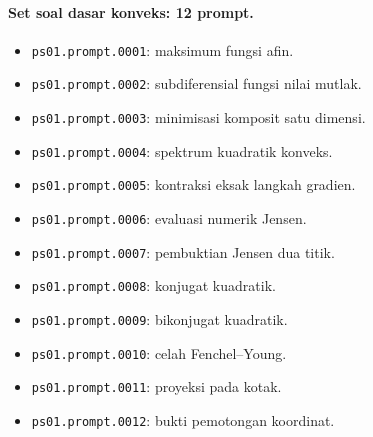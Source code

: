 \paragraph{Set soal dasar konveks: 12 prompt.}
\begin{itemize}
\item \texttt{ps01.prompt.0001}: maksimum fungsi afin.
\item \texttt{ps01.prompt.0002}: subdiferensial fungsi nilai mutlak.
\item \texttt{ps01.prompt.0003}: minimisasi komposit satu dimensi.
\item \texttt{ps01.prompt.0004}: spektrum kuadratik konveks.
\item \texttt{ps01.prompt.0005}: kontraksi eksak langkah gradien.
\item \texttt{ps01.prompt.0006}: evaluasi numerik Jensen.
\item \texttt{ps01.prompt.0007}: pembuktian Jensen dua titik.
\item \texttt{ps01.prompt.0008}: konjugat kuadratik.
\item \texttt{ps01.prompt.0009}: bikonjugat kuadratik.
\item \texttt{ps01.prompt.0010}: celah Fenchel--Young.
\item \texttt{ps01.prompt.0011}: proyeksi pada kotak.
\item \texttt{ps01.prompt.0012}: bukti pemotongan koordinat.
\end{itemize}

